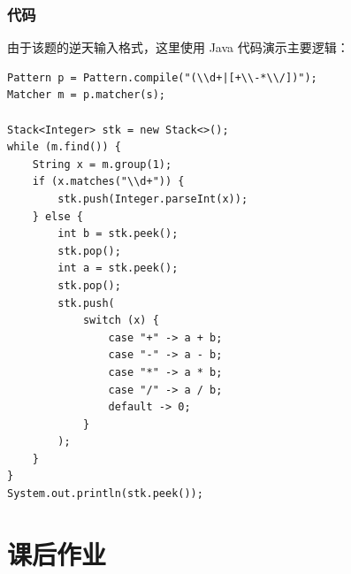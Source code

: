 \documentclass{report}
\begin{document}
\begin{center}
\end{center}

\subsubsection{代码}

由于该题的逆天输入格式，这里使用 Java 代码演示主要逻辑：

\begin{verbatim}
Pattern p = Pattern.compile("(\\d+|[+\\-*\\/])");
Matcher m = p.matcher(s);

Stack<Integer> stk = new Stack<>();
while (m.find()) {
    String x = m.group(1);
    if (x.matches("\\d+")) {
        stk.push(Integer.parseInt(x));
    } else {
        int b = stk.peek();
        stk.pop();
        int a = stk.peek();
        stk.pop();
        stk.push(
            switch (x) {
                case "+" -> a + b;
                case "-" -> a - b;
                case "*" -> a * b;
                case "/" -> a / b;
                default -> 0;
            }
        );
    }
}
System.out.println(stk.peek());
\end{verbatim}

\section{课后作业}
\end{document}
